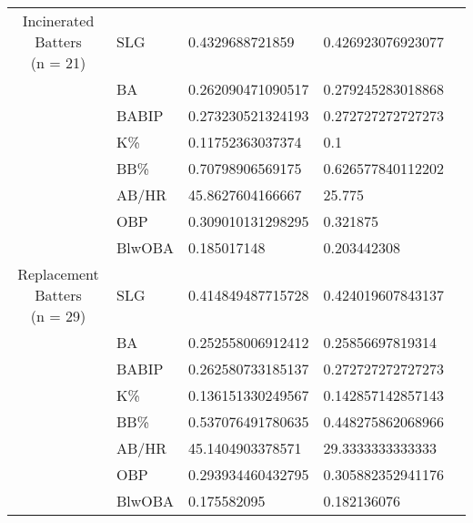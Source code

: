 \documentclass[9pt,twocolumn,twoside,a4]{sibrjnl}
\begin{document}
\begin{table}[!h]
\begin{tabular}{c >{\centering}m{} m{} m{} m{}}
         \makecell{Incinerated Batters\\(n = 21)} & SLG & 0.4329688721859 & 0.426923076923077\\
        \rowcolor{grey!30}
         & BA & 0.262090471090517 & 0.279245283018868\\
         & BABIP & 0.273230521324193 & 0.272727272727273\\
        \rowcolor{grey!30}
         & K\% & 0.11752363037374 & 0.1\\
         & BB\% & 0.70798906569175 & 0.626577840112202\\
        \rowcolor{grey!30}         
         & AB/HR & 45.8627604166667 & 25.775\\
         & OBP & 0.309010131298295 & 0.321875\\
        \rowcolor{grey!30}
         & BlwOBA & 0.185017148 & 0.203442308\\
         
        \makecell{Replacement Batters\\(n = 29)} & SLG & 0.414849487715728 & 0.424019607843137\\
        \rowcolor{grey!30}
         & BA & 0.252558006912412 & 0.25856697819314\\
         & BABIP & 0.262580733185137 & 0.272727272727273\\
        \rowcolor{grey!30}
         & K\% & 0.136151330249567 & 0.142857142857143\\
         & BB\% & 0.537076491780635 & 0.448275862068966\\
        \rowcolor{grey!30}         
         & AB/HR & 45.1404903378571 & 29.3333333333333\\
         & OBP & 0.293934460432795 & 0.305882352941176\\
        \rowcolor{grey!30}
         & BlwOBA & 0.175582095 & 0.182136076\\
    \end{tabular}
    \label{tab:neutral_batting}
\end{table}

\clearpage
\end{document}
